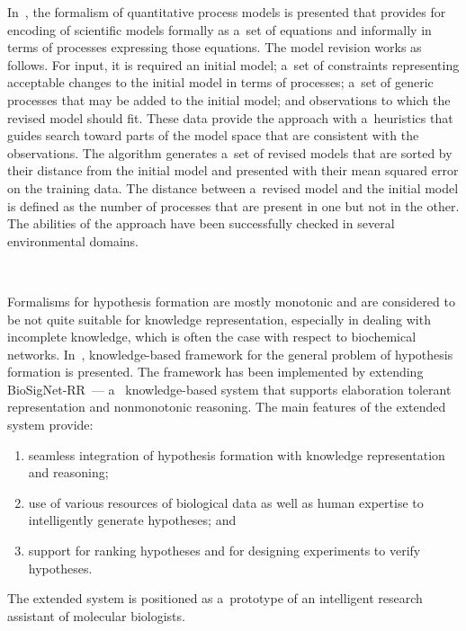 \begin{multicols}{2}
  In~\cite{51-kl}, the formalism of quantitative process models is presented that
provides for encoding of scientific models formally as a~set of equations and
informally in terms of processes expressing those equations. The model revision
works as follows. For input, it is required an initial model; a~set of constraints
representing acceptable changes to the initial model in terms of processes; a~set of
generic processes that may be added to the initial model;
and observations to which the
revised model should fit. These data provide the approach with a~heuristics that guides
search toward parts of the model space that are consistent with the observations. The
algorithm generates a~set of revised models that are sorted by their distance from the
initial model and presented with their mean squared error on the training data. The
distance between a~revised model and the initial model is defined as the number of
processes that are present in one but not in the other. The abilities of the approach
have been successfully checked in several environmental domains.

  \begin{figure*}[b] %
  \vspace*{1pt}
 \begin{center}
 \mbox{%
 \epsfxsize=150.042mm
 }
 \end{center}
 \vspace*{-9pt}
  \label{f7-kl}
  \end{figure*}

  Formalisms for hypothesis formation are mostly monotonic and are considered to
be not quite suitable for knowledge representation, especially in dealing with
incomplete knowledge, which is often the case with respect to biochemical networks.
In~\cite{52-kl}, knowledge-based framework for the general problem of hypothesis
formation is presented. The framework has been implemented by extending
BioSigNet-RR~--- a~ knowledge-based system that supports elaboration tolerant
representation and nonmonotonic reasoning. The main features of the extended
system provide:
\begin{enumerate}[(1)]
\item seamless integration of hypothesis formation with knowledge
representation and reasoning;
\item use of various resources of biological data as well
as human expertise to intelligently generate hypotheses; and
\item support for ranking
hypotheses and for designing experiments to verify hypotheses.
\end{enumerate}
 The extended system
is positioned as a~prototype of an intelligent research assistant of molecular
biologists.


\end{multicols}
